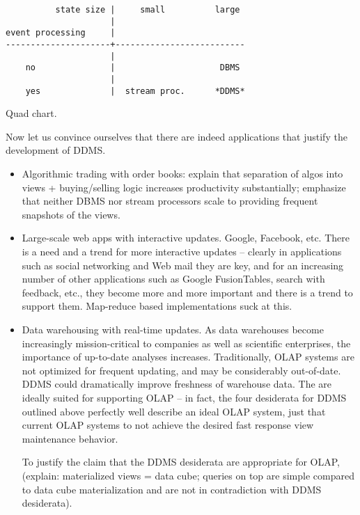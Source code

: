 \begin{table}
\begin{verbatim}
          state size |     small          large
                     |
event processing     |
---------------------+--------------------------
                     |
    no               |                     DBMS
                     |
    yes              |  stream proc.      *DDMS*
\end{verbatim}
\caption{Quad chart.}
\end{table}


Now let us convince ourselves that there are indeed applications that justify the development of DDMS.

\begin{itemize}
\item
Algorithmic trading with order books: explain that separation of algos into views + buying/selling logic increases productivity substantially; emphasize that neither DBMS nor stream processors scale to providing frequent snapshots of the views.

\item
Large-scale web apps with interactive updates.
Google, Facebook, etc. There is a need and a trend for more interactive updates -- clearly in applications such as social networking and Web mail they are key, and for an increasing number of other applications such as Google FusionTables, search with feedback, etc., they become more and more important and there is a trend to support them. Map-reduce based implementations suck at this.

\item
Data warehousing with real-time updates. As data warehouses become increasingly mission-critical to companies as well as scientific enterprises, the importance of up-to-date analyses increases. Traditionally, OLAP systems are not optimized for frequent updating, and may be considerably out-of-date. DDMS could dramatically improve freshness of warehouse data. The are ideally suited for supporting OLAP -- in fact, the four desiderata for DDMS outlined above perfectly well describe an ideal OLAP system, just that current OLAP systems to not achieve the desired fast response view maintenance behavior.

To justify the claim that the DDMS desiderata are appropriate for OLAP,
(explain: materialized views = data cube; queries on top are simple compared to data cube materialization and are not in contradiction with DDMS desiderata).
\end{itemize}




